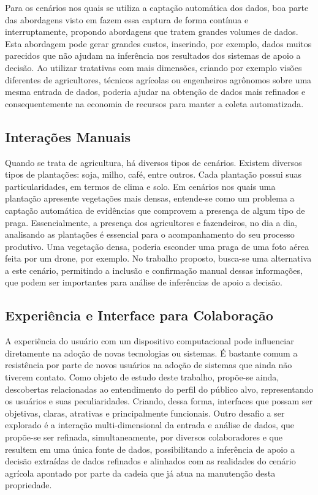 \documentclass[12pt]{article}
\begin{document}
Para os cenários nos quais se utiliza a captação automática dos dados, boa parte das abordagens visto em \cite{Massruha:2017} fazem essa captura de forma contínua e interruptamente, propondo abordagens que tratem grandes volumes de dados. Esta abordagem pode gerar grandes custos, inserindo, por exemplo, dados muitos parecidos que não ajudam na inferência nos resultados dos sistemas de apoio a decisão. Ao utilizar tratativas com mais dimensões, criando por exemplo visões diferentes de agricultores, técnicos agrícolas ou engenheiros agrônomos sobre uma mesma entrada de dados, poderia ajudar na obtenção de dados mais refinados e consequentemente na economia de recursos para manter a coleta automatizada.

\subsection{Interações Manuais}
\label{subsec:interacoes_manuais}

Quando se trata de agricultura, há diversos tipos de cenários. Existem diversos tipos de plantações: soja, milho, café, entre outros. Cada plantação possui suas particularidades, em termos de clima e solo. Em cenários nos quais uma plantação apresente vegetações mais densas, entende-se como um problema a captação automática de evidências que comprovem a presença de algum tipo de praga. Essencialmente, a presença dos agricultores e fazendeiros, no dia a dia, analisando as plantações é essencial para o acompanhamento do seu processo produtivo. Uma vegetação densa, poderia esconder uma praga de uma foto aérea feita por um drone, por exemplo. No trabalho proposto, busca-se uma alternativa a este cenário, permitindo a inclusão e confirmação manual dessas informações, que podem ser importantes para análise de inferências de apoio a decisão.

\subsection{Experiência e Interface para Colaboração}
\label{subsec:experiencia_interface_colaboracao}

A experiência do usuário com um dispositivo computacional pode influenciar diretamente na adoção de novas tecnologias ou sistemas. É bastante comum a resistência por parte de novos usuários na adoção de sistemas que ainda não tiverem contato. Como objeto de estudo deste trabalho, propõe-se ainda, descobertas relacionadas ao entendimento do perfil do público alvo, representando os usuários e suas peculiaridades. Criando, dessa forma, interfaces que possam ser objetivas, claras, atrativas e principalmente funcionais. Outro desafio a ser explorado é a interação multi-dimensional da entrada e análise de dados, que propõe-se ser refinada, simultaneamente, por diversos colaboradores e que resultem em uma única fonte de dados, possibilitando a inferência de apoio a decisão extraídas de dados refinados e alinhados com as realidades do cenário agrícola apontado por parte da cadeia que já atua na manutenção desta propriedade.
\end{document}
